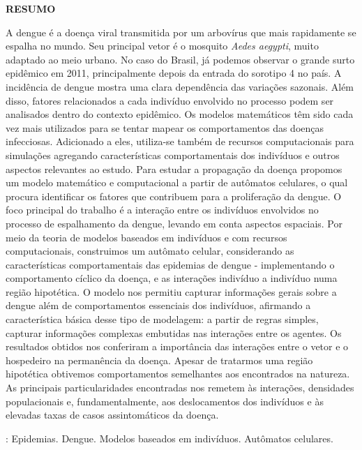 \newpage
\thispagestyle{empty}
\vspace{1.5cm}
\begin{center}
{\large{\textbf{RESUMO}}}
\end{center}
\vspace{0.5cm}

\begin{spacing}{1.0}
\noindent A dengue é a doença viral transmitida por um arbovírus que mais rapidamente se espalha no mundo. Seu principal vetor é o mosquito \emph{Aedes aegypti}, muito adaptado ao meio urbano. No caso do Brasil, já podemos observar o grande surto epidêmico em 2011, principalmente depois da entrada do sorotipo 4 no país. A incidência de dengue mostra uma clara dependência das variações sazonais. Além disso, fatores relacionados a cada indivíduo envolvido no processo podem ser analisados dentro do contexto epidêmico. Os modelos matemáticos têm sido cada vez mais utilizados para se tentar mapear os comportamentos das doenças infecciosas. Adicionado a eles, utiliza-se também de recursos computacionais para simulações agregando características comportamentais dos indivíduos e outros aspectos relevantes ao estudo. Para estudar a propagação da doença propomos um modelo matemático e computacional a partir de autômatos celulares, o qual procura identificar os fatores que contribuem para a proliferação da dengue. O foco principal do trabalho é a interação entre os indivíduos envolvidos no processo de espalhamento da dengue, levando em conta aspectos espaciais. Por meio da teoria de modelos baseados em indivíduos e com recursos computacionais, construimos um autômato celular, considerando as características comportamentais das epidemias de dengue - implementando o comportamento cíclico da doença, e as interações indivíduo a indivíduo numa região hipotética. O modelo nos permitiu capturar informações gerais sobre a dengue além de comportamentos essenciais dos indivíduos, afirmando a característica básica desse tipo de modelagem: a partir de regras simples, capturar informações complexas embutidas nas interações entre os agentes. Os resultados obtidos nos conferiram a importância das interações entre o vetor e o hospedeiro na permanência da doença. Apesar de tratarmos uma região hipotética obtivemos comportamentos semelhantes aos encontrados na natureza. As principais particularidades encontradas nos remetem às interações, densidades populacionais e, fundamentalmente, aos deslocamentos dos indivíduos e às elevadas taxas de casos assintomáticos da doença.
\end{spacing}

\vspace{1.5ex}

: Epidemias. Dengue. Modelos baseados em indivíduos. Autômatos celulares.

